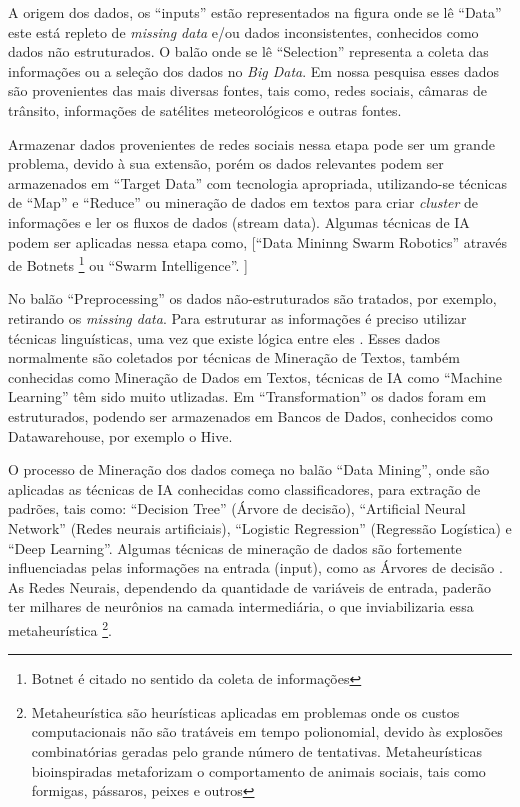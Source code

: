 A origem dos dados, os ``inputs'' estão representados na figura onde se lê ``Data'' este está repleto de \textit{missing data} e/ou dados inconsistentes, conhecidos como dados não estruturados. 
O balão onde se lê ``Selection'' representa a coleta das informações ou a seleção dos dados no \textit{Big Data}.
Em nossa pesquisa esses dados são provenientes das mais diversas fontes, tais como, redes sociais, câmaras de trânsito, informações de satélites meteorológicos e outras fontes.

Armazenar dados provenientes de redes sociais nessa etapa pode ser um grande problema, devido à sua extensão, porém os dados relevantes podem ser armazenados em ``Target Data'' 
com tecnologia apropriada, utilizando-se técnicas de ``Map'' e ``Reduce'' ou mineração de dados em textos para criar \textit{cluster} de informações e ler os fluxos de dados (stream data). 
Algumas técnicas de IA podem ser aplicadas nessa etapa como, [``Data Mininng Swarm Robotics'' através de Botnets \footnote{Botnet é citado no sentido da coleta de informações} ou ``Swarm Intelligence''. ]

No balão ``Preprocessing'' os dados não-estruturados são tratados, por exemplo, retirando os \textit{missing data}. 
Para estruturar as informações é preciso utilizar técnicas linguísticas, uma vez que existe lógica entre eles \cite{Aranha2006}.
Esses dados normalmente são coletados por técnicas de Mineração de Textos, também conhecidas como Mineração de Dados em Textos, técnicas de IA como ``Machine Learning'' 
têm sido muito utlizadas. Em ``Transformation'' os dados foram em estruturados, podendo ser armazenados em Bancos de Dados, conhecidos como Datawarehouse, por exemplo o Hive. 

O processo de Mineração dos dados começa no balão ``Data Mining'', onde são aplicadas as técnicas de IA conhecidas como classificadores, para extração de padrões, tais como: 
``Decision Tree'' (Árvore de decisão), ``Artificial Neural Network'' (Redes neurais artificiais), ``Logistic Regression'' (Regressão Logística) e ``Deep Learning''.
Algumas técnicas de mineração de dados são fortemente influenciadas pelas informações na entrada (input), como as Árvores de decisão \cite{DecisionTree}. 
As Redes Neurais, dependendo da quantidade de variáveis de entrada, paderão ter milhares de neurônios na camada intermediária, o que inviabilizaria essa metaheurística 
\footnote{Metaheurística são heurísticas aplicadas em problemas onde os custos computacionais não são tratáveis em tempo polionomial, devido às explosões combinatórias geradas
pelo grande número de tentativas. Metaheurísticas bioinspiradas metaforizam o comportamento de animais sociais, tais como formigas, pássaros, peixes e outros}.

